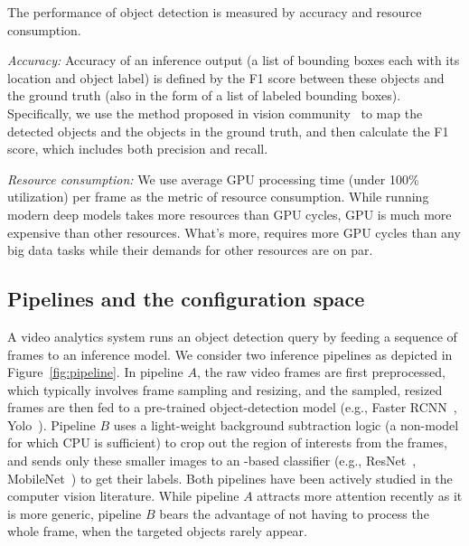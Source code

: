 The performance of object detection is measured by accuracy and 
resource consumption.
\begin{packeditemize}
\item {\em Accuracy:} 
Accuracy of an \nn inference output (a list of bounding boxes each 
with its location and object label) is defined by the F1 score between
these  objects and the ground truth (also in the form of a list of
labeled bounding boxes). 
Specifically, we use the method proposed in vision 
community~\cite{http://homepages.inf.ed.ac.uk/ckiw/postscript/ijcv_voc09.pdf}
to map the detected objects and the objects in the ground truth, 
and then calculate the F1 score, which includes both precision and 
recall.
\item {\em Resource consumption:}
We use average GPU processing time (under 100\% utilization) per frame
as the metric of resource consumption.
While running modern deep \nn models takes more resources than GPU 
cycles, GPU is much more expensive than other resources.
What's more, \nn requires more GPU cycles than any big data tasks while
their demands for other resources are on par.
\end{packeditemize}

\subsection{Pipelines and the configuration space}

A video analytics system runs an object detection query by feeding 
a sequence of frames to an \nn inference model.
We consider two inference pipelines as depicted in 
Figure~\ref{fig:pipeline}.
In pipeline $A$, the raw video frames are first preprocessed, 
which typically involves frame sampling and resizing, and the sampled,
resized frames are then fed to a pre-trained object-detection model
(e.g., Faster RCNN~\cite{??}, Yolo~\cite{??}). 
Pipeline $B$ uses a light-weight background subtraction logic (a 
non-\nn model for which CPU is sufficient) to crop out the region of 
interests from the frames, and sends only these smaller images to an
\nn-based classifier 
(e.g., ResNet~\cite{??}, MobileNet~\cite{??}) to get their labels.
Both pipelines have been actively studied in the computer vision 
literature.
While pipeline $A$ attracts more attention recently as it is more 
generic, pipeline $B$ bears the advantage of not having to process 
the whole frame, when the targeted objects rarely appear.

